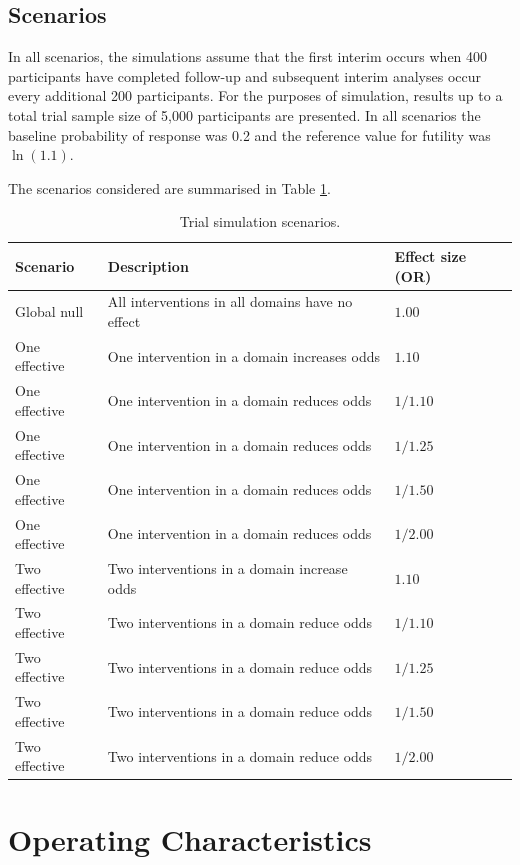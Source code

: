 \documentclass[
]{article}
\begin{document}
\hypertarget{scenarios}{%
\subsection{Scenarios}\label{scenarios}}

In all scenarios, the simulations assume that the first interim occurs when 400 participants have completed follow-up and subsequent interim analyses occur every additional 200 participants.
For the purposes of simulation, results up to a total trial sample size of 5,000 participants are presented. In all scenarios the baseline probability of response was 0.2 and the reference value for futility was \(\ln(1.1)\).

The scenarios considered are summarised in Table \ref{tab:scetab}.

\begin{table}[H]

\caption{\label{tab:scetab}Trial simulation scenarios.}
\centering
\begin{tabular}[t]{lll}
\toprule
Scenario & Description & Effect size (OR)\\
\midrule
Global null & All interventions in all domains have no effect & $1.00$\\
One effective & One intervention in a domain increases odds & $1.10$\\
One effective & One intervention in a domain reduces odds & $1/1.10$\\
One effective & One intervention in a domain reduces odds & $1/1.25$\\
One effective & One intervention in a domain reduces odds & $1/1.50$\\
One effective & One intervention in a domain reduces odds & $1/2.00$\\
Two effective & Two interventions in a domain increase odds & $1.10$\\
Two effective & Two interventions in a domain reduce odds & $1/1.10$\\
Two effective & Two interventions in a domain reduce odds & $1/1.25$\\
Two effective & Two interventions in a domain reduce odds & $1/1.50$\\
Two effective & Two interventions in a domain reduce odds & $1/2.00$\\
\bottomrule
\end{tabular}
\end{table}

\clearpage

\hypertarget{operating-characteristics}{%
\section{Operating Characteristics}\label{operating-characteristics}}
\end{document}
